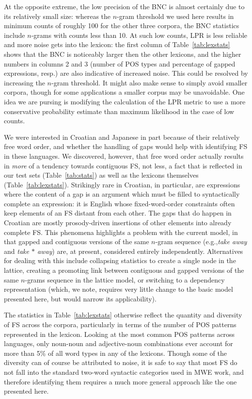 \documentclass[11pt,letterpaper]{article}
\makeatletter
\def \eg {e.g.,\@ }
\newcommand{\gap}{$*$\xspace}
\newcommand{\ex}[1]{\textit{#1}\xspace}
\newcommand{\tabref}[2][]{Table#1~\ref{#2}\xspace}
\makeatother
\begin{document}
At the opposite extreme, the low precision of the BNC is almost certainly due to its relatively small size: whereas the $n$-gram threshold we used here results in minimum counts of roughly 100 for the other three corpora, the BNC statistics include $n$-grams with counts less than 10. At such low counts, LPR is less reliable and more noise gets into the lexicon: the first column of \tabref{tab:lexstats} shows that the BNC is noticeably larger then the other lexicons, and the higher numbers in columns 2 and 3 (number of POS types and percentage of gapped expressions, resp.) are also indicative of increased noise.  This  could be resolved by increasing the $n$-gram threshold. It might also make sense to simply avoid smaller corpora, though for some applications a smaller corpus may be unavoidable. One idea we are pursing is modifying the calculation of the LPR metric to use a more conservative  probability estimate than maximum likelihood in the case of low counts.

We were interested in Croatian and Japanese in part because of their relatively free word order, and whether the handling of gaps would help with identifying FS in these languages. We discovered, however, that free word order actually results in \emph{more} of a tendency towards contiguous FS, not less, a fact that is reflected in our test sets (\tabref{tab:stats}) as well as the lexicons themselves (\tabref{tab:lexstats}). Strikingly rare in Croatian, in particular, are expressions where the content of a gap is an argument which must be filled to syntactically complete an expression: it is English whose fixed-word-order constraints often keep elements of an FS distant from each other. The gaps that do happen in Croatian are mostly prosody-driven insertions of other elements into already complete FS. This phenomena highlights a problem with the current model, in that gapped and contiguous versions of the same $n$-gram sequence (\eg \ex{take away} and \ex{take \gap away}) are, at present, considered entirely independently. Alternatives for dealing with this include collapsing statistics to create a single node in the lattice, creating a promoting link between contiguous and gapped versions of the same $n$-grams sequence in the lattice model, or switching to a dependency representation (which, we note, requires very little change to the basic model presented here, but would narrow its applicability). 


The statistics in \tabref{tab:lexstats} otherwise reflect the quantity and diversity of FS across the corpora, particularly in terms of the number of POS patterns represented in the lexicon. Looking at the most common POS patterns across languages, only noun-noun and adjective-noun combinations ever account for more than 5\% of all word types in any of the lexicons. Though some of the diversity can of course be attributed to noise, it is safe to say that most FS do not fall into the standard two-word syntactic categories used in MWE work, and therefore identifying them requires a much more general approach like the one presented here.
\end{document}
